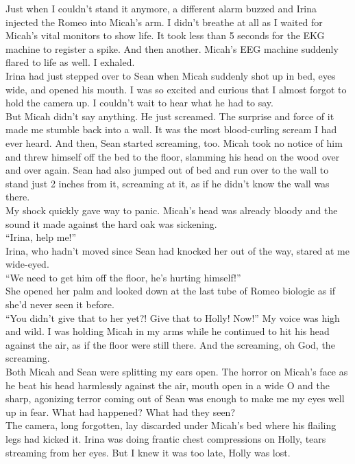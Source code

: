 \documentclass[a5paper]{scrartcl}
\begin{document}
Just when I couldn't stand it anymore, a different alarm buzzed and Irina injected the Romeo into Micah's arm. I didn't breathe at all as I waited for Micah's vital monitors to show life. It took less than 5 seconds for the EKG machine to register a spike. And then another. Micah's EEG machine suddenly flared to life as well. I exhaled.\\
Irina had just stepped over to Sean when Micah suddenly shot up in bed, eyes wide, and opened his mouth. I was so excited and curious that I almost forgot to hold the camera up. I couldn't wait to hear what he had to say.\\
But Micah didn't say anything. He just screamed. The surprise and force of it made me stumble back into a wall. It was the most blood-curling scream I had ever heard. And then, Sean started screaming, too. Micah took no notice of him and threw himself off the bed to the floor, slamming his head on the wood over and over again. Sean had also jumped out of bed and run over to the wall to stand just 2 inches from it, screaming at it, as if he didn't know the wall was there.\\
My shock quickly gave way to panic. Micah's head was already bloody and the sound it made against the hard oak was sickening.\\
\enquote{Irina, help me!}\\
Irina, who hadn't moved since Sean had knocked her out of the way, stared at me wide-eyed.\\
\enquote{We need to get him off the floor, he's hurting himself!}\\
She opened her palm and looked down at the last tube of Romeo biologic as if she'd never seen it before.\\
\enquote{You didn't give that to her yet?! Give that to Holly! Now!} My voice was high and wild. I was holding Micah in my arms while he continued to hit his head against the air, as if the floor were still there. And the screaming, oh God, the screaming.\\
Both Micah and Sean were splitting my ears open. The horror on Micah's face as he beat his head harmlessly against the air, mouth open in a wide O and the sharp, agonizing terror coming out of Sean was enough to make me my eyes well up in fear. What had happened? What had they seen?\\
The camera, long forgotten, lay discarded under Micah's bed where his flailing legs had kicked it. Irina was doing frantic chest compressions on Holly, tears streaming from her eyes. But I knew it was too late, Holly was lost.\\
\end{document}
